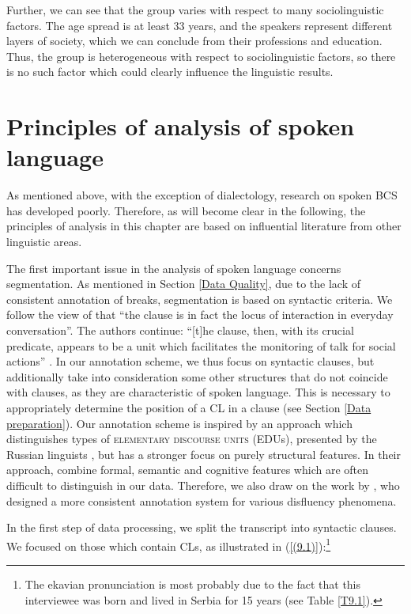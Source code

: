 Further, we can see that the group varies with respect to many sociolinguistic factors. The age spread is at least 33 years, and the speakers represent different layers of society, which we can conclude from their professions and education. Thus, the group is heterogeneous with respect to sociolinguistic factors, so there is no such factor which could clearly influence the linguistic results.

\section{Principles of analysis of spoken language}
\label{Principles of analysis of spoken language}
As mentioned above, with the exception of dialectology, research on spoken BCS has developed poorly. Therefore, as will become clear in the following, the principles of analysis in this chapter are based on influential literature from other linguistic areas. 

The first important issue in the analysis of spoken language concerns segmentation. As mentioned in Section \ref{Data Quality}, due to the lack of consistent annotation of breaks, segmentation is based on syntactic criteria. We follow the view of \citet[484]{ThompsonCouper05} that “the clause is in fact the locus of interaction in everyday conversation”. The authors continue: “[t]he clause, then, with its crucial predicate, appears to be a unit which facilitates the monitoring of talk for social actions” \citep[cf.][485]{ThompsonCouper05}. In our annotation scheme, we thus focus on syntactic clauses, but additionally take into consideration some other structures that do not coincide with clauses, as they are characteristic of spoken language. This is necessary to appropriately determine the position of a CL in a clause (see Section \ref{Data preparation}). Our annotation scheme is inspired by an approach which distinguishes types of \textsc{elementary} \textsc{discourse} \textsc{units} (EDUs), presented by the Russian linguists \citep{KibrikPodlesskaya03, KibrikPodlesskaya06}, but has a stronger focus on purely structural features. In their approach, \citet{KibrikPodlesskaya03, KibrikPodlesskaya06} combine formal, semantic and cognitive features which are often difficult to distinguish in our data. Therefore, we also draw on the work by \citet{Crible16, Crible18}, who designed a more consistent annotation system for various disfluency phenomena. 

In the first step of data processing, we split the transcript into syntactic clauses. We focused on those which contain CLs, as illustrated in (\ref{(9.1)}):\footnote{The ekavian pronunciation is most probably due to the fact that this interviewee was born and lived in Serbia for 15 years (see Table \ref{T9.1}).}

